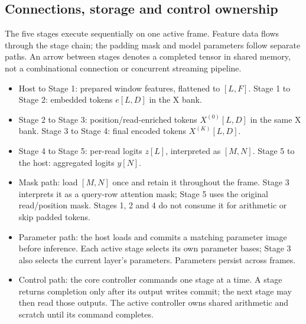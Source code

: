 \documentclass[11pt,a4paper]{article}
\begin{document}
\begin{center}
\end{center}

\subsection{Connections, storage and control ownership}
The five stages execute sequentially on one active frame. Feature data flows through the stage chain; the padding mask and model parameters follow separate paths. An arrow between stages denotes a completed tensor in shared memory, not a combinational connection or concurrent streaming pipeline.
\begin{itemize}
\item Host to Stage 1: prepared window features, flattened to $[L,F]$. Stage 1 to Stage 2: embedded tokens $e[L,D]$ in the X bank.
\item Stage 2 to Stage 3: position/read-enriched tokens $X^{(0)}[L,D]$ in the same X bank. Stage 3 to Stage 4: final encoded tokens $X^{(K)}[L,D]$.
\item Stage 4 to Stage 5: per-read logits $z[L]$, interpreted as $[M,N]$. Stage 5 to the host: aggregated logits $y[N]$.
\item Mask path: load $[M,N]$ once and retain it throughout the frame. Stage 3 interprets it as a query-row attention mask; Stage 5 uses the original read/position mask. Stages 1, 2 and 4 do not consume it for arithmetic or skip padded tokens.
\item Parameter path: the host loads and commits a matching parameter image before inference. Each active stage selects its own parameter bases; Stage 3 also selects the current layer's parameters. Parameters persist across frames.
\item Control path: the core controller commands one stage at a time. A stage returns completion only after its output writes commit; the next stage may then read those outputs. The active controller owns shared arithmetic and scratch until its command completes.
\end{itemize}
\end{document}
